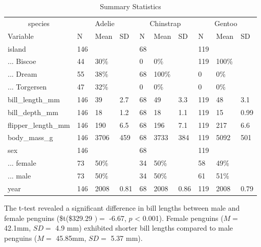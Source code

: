 \documentclass[
  man,
  longtable,
  nolmodern,
  notxfonts,
  notimes,
  colorlinks=true,linkcolor=blue,citecolor=blue,urlcolor=blue]{apa7}
\begin{document}
\begin{table}

\caption{\label{tab:descriptive_statistics}Summary Statistics}
\centering
\begin{tabular}[t]{llllllllll}
\toprule
\multicolumn{1}{c}{species} & \multicolumn{3}{c}{Adelie} & \multicolumn{3}{c}{Chinstrap} & \multicolumn{3}{c}{Gentoo} \\
\cmidrule(l{3pt}r{3pt}){1-1} \cmidrule(l{3pt}r{3pt}){2-4} \cmidrule(l{3pt}r{3pt}){5-7} \cmidrule(l{3pt}r{3pt}){8-10}
Variable & N & Mean & SD & N & Mean & SD & N & Mean & SD\\
\midrule
island & 146 &  &  & 68 &  &  & 119 &  & \\
... Biscoe & 44 & 30\% &  & 0 & 0\% &  & 119 & 100\% & \\
... Dream & 55 & 38\% &  & 68 & 100\% &  & 0 & 0\% & \\
... Torgersen & 47 & 32\% &  & 0 & 0\% &  & 0 & 0\% & \\
bill\_length\_mm & 146 & 39 & 2.7 & 68 & 49 & 3.3 & 119 & 48 & 3.1\\
\addlinespace
bill\_depth\_mm & 146 & 18 & 1.2 & 68 & 18 & 1.1 & 119 & 15 & 0.99\\
flipper\_length\_mm & 146 & 190 & 6.5 & 68 & 196 & 7.1 & 119 & 217 & 6.6\\
body\_mass\_g & 146 & 3706 & 459 & 68 & 3733 & 384 & 119 & 5092 & 501\\
sex & 146 &  &  & 68 &  &  & 119 &  & \\
... female & 73 & 50\% &  & 34 & 50\% &  & 58 & 49\% & \\
\addlinespace
... male & 73 & 50\% &  & 34 & 50\% &  & 61 & 51\% & \\
year & 146 & 2008 & 0.81 & 68 & 2008 & 0.86 & 119 & 2008 & 0.79\\
\bottomrule
\end{tabular}
\end{table}

The t-test revealed a significant difference in bill lengths between
male and female penguins (\$t(\$329.29 \()=\) -6.67, \(p\) \textless{}
0.001). Female penguins (\(M=\) 42.1mm, \(SD=\) 4.9 mm) exhibited
shorter bill lengths compared to male penguins (\(M=\) 45.85mm, \(SD=\)
5.37 mm).
\end{document}
